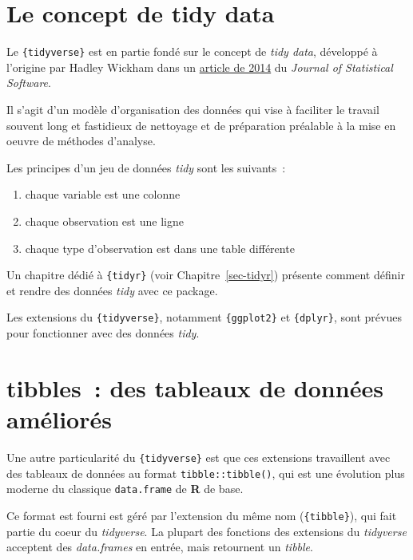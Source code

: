 \documentclass[
  letterpaper,
  DIV=11,
  numbers=noendperiod,
  oneside]{scrreprt}
\providecommand{\tightlist}{%
  \setlength{\itemsep}{0pt}\setlength{\parskip}{0pt}}\usepackage{longtable,booktabs,array}
\begin{document}
\hypertarget{sec-tidy-data}{%
\section{Le concept de tidy data}\label{sec-tidy-data}}

Le \texttt{\{tidyverse\}} est en partie fondé sur le concept de
\emph{tidy data}, développé à l'origine par Hadley Wickham dans un
\href{https://www.jstatsoft.org/article/view/v059i10}{article de 2014}
du \emph{Journal of Statistical Software}.

Il s'agit d'un modèle d'organisation des données qui vise à faciliter le
travail souvent long et fastidieux de nettoyage et de préparation
préalable à la mise en oeuvre de méthodes d'analyse.

Les principes d'un jeu de données \emph{tidy} sont les suivants~:

\begin{enumerate}
\def\labelenumi{\arabic{enumi}.}
\tightlist
\item
  chaque variable est une colonne
\item
  chaque observation est une ligne
\item
  chaque type d'observation est dans une table différente
\end{enumerate}

Un chapitre dédié à \texttt{\{tidyr\}} (voir Chapitre~\ref{sec-tidyr})
présente comment définir et rendre des données \emph{tidy} avec ce
package.

Les extensions du \texttt{\{tidyverse\}}, notamment \texttt{\{ggplot2\}}
et \texttt{\{dplyr\}}, sont prévues pour fonctionner avec des données
\emph{tidy}.

\hypertarget{tibbles}{%
\section{tibbles~: des tableaux de données améliorés}\label{tibbles}}

Une autre particularité du \texttt{\{tidyverse\}} est que ces extensions
travaillent avec des tableaux de données au format
\texttt{tibble::tibble()}, qui est une évolution plus moderne du
classique \texttt{data.frame} de \textbf{R} de base.

Ce format est fourni est géré par l'extension du même nom
(\texttt{\{tibble\}}), qui fait partie du coeur du \emph{tidyverse}. La
plupart des fonctions des extensions du \emph{tidyverse} acceptent des
\emph{data.frames} en entrée, mais retournent un \emph{tibble}.
\end{document}
